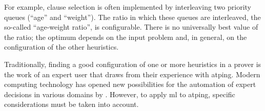 For example, clause selection is often implemented by interleaving two priority queues (\enquote{age} and \enquote{weight}).
The ratio in which these queues are interleaved, the so-called \enquote{age-weight ratio}, is configurable.
There is no universally best value of the ratio;
the optimum depends on the input problem
\cite{DBLP:conf/cade/SchulzM16}
and, in general, on the configuration of the other heuristics.

Traditionally, finding a good configuration of one or more heuristics in a prover is the work of an expert user that draws from their experience with \gls{atping}.
Modern computing technology has opened new possibilities for the automation of expert decisions in various domains by  \cite{DBLP:books/lib/HastieTF09,DBLP:journals/nn/Schmidhuber15}.
However, to apply \gls{ml} to \gls{atping}, specific considerations
must be taken into account.

